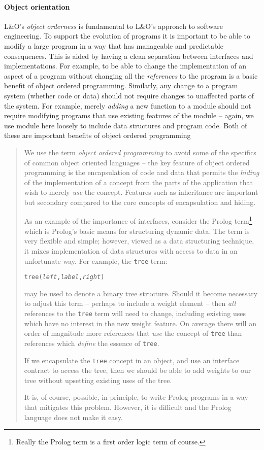 \paragraph{Object orientation}
L&O's \emph{object orderness} is fundamental to L&O's approach to  software engineering.  To support the evolution of programs it is important to be able to modify a large program in a way that has manageable and predictable consequences. This is aided by having a clean separation between interfaces and implementations. For example, to be able to change the implementation of an aspect of a program without changing all the \emph{references} to the program is a basic benefit of object ordered programming. Similarly, any change to a program system (whether code or data) should not require changes to unaffected parts of the system. For example, merely \emph{adding} a new function to a module should not require modifying programs that use existing features of the module -- again, we use module here loosely to include data structures and program code. Both of these are important benefits of object ordered programming

\begin{quote}
We use the term \emph{object ordered programming} to avoid some of the specifics of common object oriented languages -- the key feature of object ordered programming is the encapsulation of code and data that permits the \emph{hiding} of the implementation of a concept from the parts of the application that wish to merely \emph{use} the concept. Features such as inheritance are important but secondary compared to the core concepts of encapsulation and hiding.

As an example of the importance of interfaces, consider the Prolog term\footnote{Really the Prolog term is a first order logic term of course.} -- which is Prolog's basic means for structuring dynamic data. The term is very flexible and simple; however, viewed as a data structuring technique, it mixes implementation of data structures with access to data in an unfortunate way. For example, the \verb+tree+ term:
\begin{alltt}
tree(\emph{left},\emph{label},\emph{right})
\end{alltt}
may be used to denote a binary tree structure. Should it become necessary to adjust this term -- perhaps to include a weight element -- then \emph{all} references to the \verb+tree+ term will need to change, including existing uses which have no interest in the new weight feature. On average there will an order of magnitude more references that \emph{use} the concept of \verb+tree+ than references which \emph{define} the essence of \verb+tree+.

If we encapsulate the \verb+tree+ concept in an object, and use an interface contract to access the tree, then we should be able to add weights to our tree without upsetting existing uses of the tree.

It is, of course, possible, in principle, to write Prolog programs in a way that mitigates this problem. However, it is difficult and the Prolog language does not make it easy.
\end{quote}

